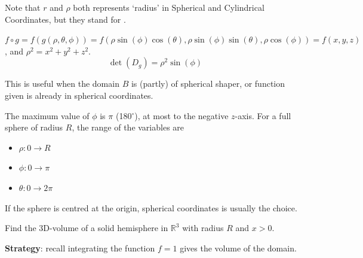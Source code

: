 Note that $r$ and $\rho$ both represents `radius' in Spherical and Cylindrical Coordinates, but they stand for . 

$f \circ g = f(g(\rho, \theta, \phi)) = f(\rho \sin(\phi) \cos(\theta), \rho \sin(\phi) \sin(\theta), \rho \cos(\phi)) = f(x, y, z)$, and $\rho^2 = x^2 + y^2 + z^2$. 
$$\det(D_g) = \rho^2 \sin(\phi)$$

This is useful when the domain $B$ is (partly) of spherical shaper, or function given is already in spherical coordinates. 

The maximum value of $\phi$ is $\pi$ (180$^\circ$), at most to the negative $z$-axis. For a full sphere of radius $R$, the range of the variables are 
\begin{itemize}
    \item $\rho: 0 \to R$
    \item $\phi: 0 \to \pi$
    \item $\theta: 0 \to 2\pi$
\end{itemize}

If the sphere is  centred at the origin, spherical coordinates is usually  the choice. 

\begin{exercise}
    Find the 3D-volume of a solid hemisphere in $\mathbb{R}^3$ with radius $R$ and $x > 0$. 

    \textbf{Strategy}: recall integrating the function $f = 1$ gives the volume of the domain. 
\end{exercise}
